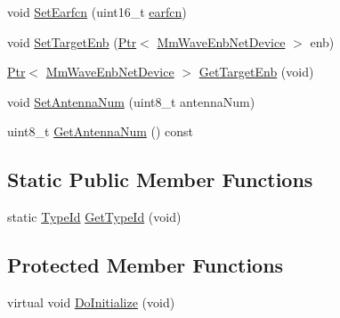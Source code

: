 \begin{DoxyCompactItemize}
\item 
void \hyperlink{classns3_1_1MmWaveUeNetDevice_a3398f452a548a40b7ac8d762da43258b}{Set\+Earfcn} (uint16\+\_\+t \hyperlink{generate__test__data__lte__spectrum__value__txpsd_8m_a584be7562abb392609629331f8c6c42c}{earfcn})
\item 
void \hyperlink{classns3_1_1MmWaveUeNetDevice_a560c76b57a7a1e4143f823e75f5d5065}{Set\+Target\+Enb} (\hyperlink{classns3_1_1Ptr}{Ptr}$<$ \hyperlink{classns3_1_1MmWaveEnbNetDevice}{Mm\+Wave\+Enb\+Net\+Device} $>$ enb)
\item 
\hyperlink{classns3_1_1Ptr}{Ptr}$<$ \hyperlink{classns3_1_1MmWaveEnbNetDevice}{Mm\+Wave\+Enb\+Net\+Device} $>$ \hyperlink{classns3_1_1MmWaveUeNetDevice_acb18ff09cb3dc6e75fbccf937ef01745}{Get\+Target\+Enb} (void)
\item 
void \hyperlink{classns3_1_1MmWaveUeNetDevice_aa6c5aafa53a659a065535e18254b6925}{Set\+Antenna\+Num} (uint8\+\_\+t antenna\+Num)
\item 
uint8\+\_\+t \hyperlink{classns3_1_1MmWaveUeNetDevice_a3735faee81224712d691e85fd593ddc6}{Get\+Antenna\+Num} () const 
\end{DoxyCompactItemize}
\subsection*{Static Public Member Functions}
\begin{DoxyCompactItemize}
\item 
static \hyperlink{classns3_1_1TypeId}{Type\+Id} \hyperlink{classns3_1_1MmWaveUeNetDevice_a1f85c907987b4c038ed27f82ca9ba757}{Get\+Type\+Id} (void)
\end{DoxyCompactItemize}
\subsection*{Protected Member Functions}
\begin{DoxyCompactItemize}
\item 
virtual void \hyperlink{classns3_1_1MmWaveUeNetDevice_a604ba1131f78f30b44efbef7f546a1e8}{Do\+Initialize} (void)
\end{DoxyCompactItemize}
